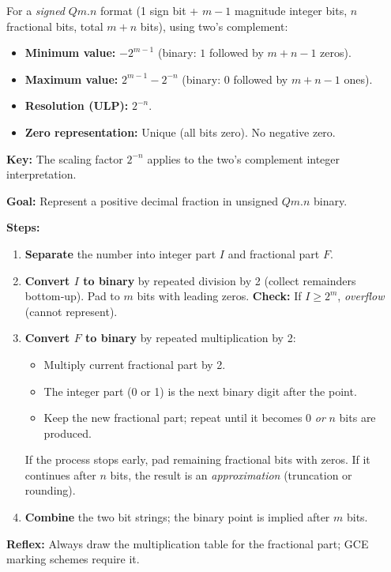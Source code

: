 \documentclass[11pt]{article}
\begin{document}
\begin{propriete}
For a \emph{signed} $Qm.n$ format (1 sign bit + $m-1$ magnitude integer bits, $n$ fractional bits, total $m+n$ bits), using two's complement:
\begin{itemize}
    \item \textbf{Minimum value:} $-2^{m-1}$ (binary: $1$ followed by $m+n-1$ zeros).
    \item \textbf{Maximum value:} $2^{m-1} - 2^{-n}$ (binary: $0$ followed by $m+n-1$ ones).
    \item \textbf{Resolution (ULP):} $2^{-n}$.
    \item \textbf{Zero representation:} Unique (all bits zero). No negative zero.
\end{itemize}
\textbf{Key:} The scaling factor $2^{-n}$ applies to the two's complement integer interpretation.
\end{propriete}

\begin{methode}
\textbf{Goal:} Represent a positive decimal fraction in unsigned $Qm.n$ binary.\par
\textbf{Steps:}
\begin{enumerate}
    \item \textbf{Separate} the number into integer part $I$ and fractional part $F$.
    \item \textbf{Convert $I$ to binary} by repeated division by 2 (collect remainders bottom‑up). Pad to $m$ bits with leading zeros. \textbf{Check:} If $I \ge 2^m$, \emph{overflow} (cannot represent).
    \item \textbf{Convert $F$ to binary} by repeated multiplication by 2:
          \begin{itemize}
              \item Multiply current fractional part by 2.
              \item The integer part (0 or 1) is the next binary digit after the point.
              \item Keep the new fractional part; repeat until it becomes 0 \emph{or} $n$ bits are produced.
          \end{itemize}
          If the process stops early, pad remaining fractional bits with zeros. If it continues after $n$ bits, the result is an \emph{approximation} (truncation or rounding).
    \item \textbf{Combine} the two bit strings; the binary point is implied after $m$ bits.
\end{enumerate}
\textbf{Reflex:} Always draw the multiplication table for the fractional part; GCE marking schemes require it.
\end{methode}
\end{document}
